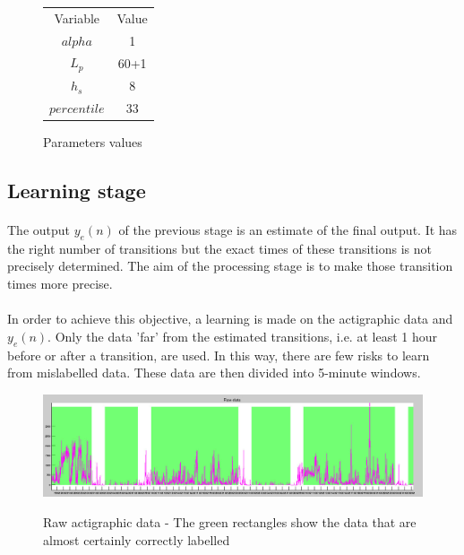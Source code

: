 \documentclass[a4paper,12pt]{article}
\newlength\savewidth
\newcommand\Ghline{%
	\noalign{\global\savewidth\arrayrulewidth\global\arrayrulewidth2pt}%
	\hline
	\noalign{\global\arrayrulewidth\savewidth}}
\begin{document}
\begin{figure}[H]
\centering
\begin{tabular}{|c|c|}
\hline
Variable & Value \\
\Ghline
$alpha$ & 1 \\
$L_p$ & 60+1 \\
$h_s$ & 8 \\
$percentile$ & 33 \\
\hline
\end{tabular}
\caption{Parameters values}
\end{figure}

\subsection{Learning stage}

\paragraph{}
The output $y_e(n)$ of the previous stage is an estimate of the final output. It has the right number of transitions but the exact times of these transitions is not precisely determined. The aim of the processing stage is to make those transition times more precise.

\paragraph{}
In order to achieve this objective, a learning is made on the actigraphic data and $y_e(n)$. Only the data 'far' from the estimated transitions, i.e. at least 1 hour before or after a transition, are used. In this way, there are few risks to learn from mislabelled data. These data are then divided into 5-minute windows.

\begin{figure}[h]
\centering
\includegraphics[scale=0.25]{Images/validData.jpg}
\label{valid}
\caption{Raw actigraphic data - The green rectangles show the data that are almost certainly correctly labelled}
\end{figure}
\end{document}
